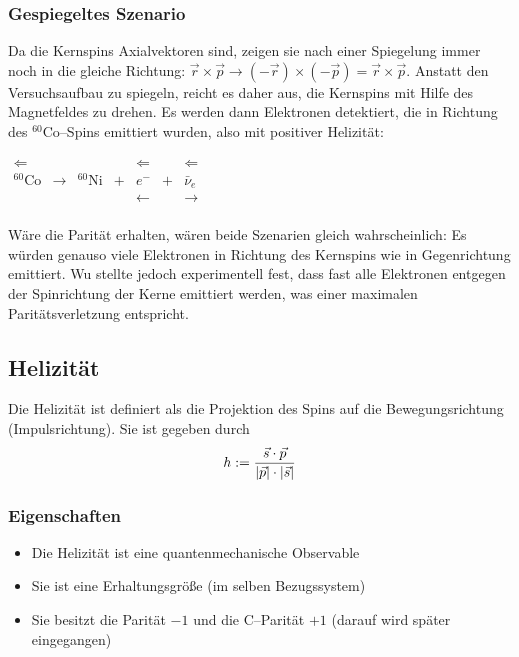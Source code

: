 \documentclass[Ex4_Zusammenfassung.tex]{subfiles}
\begin{document}
\subsubsection*{Gespiegeltes Szenario}
Da die Kernspins Axialvektoren sind, zeigen sie nach einer Spiegelung immer noch in die gleiche Richtung: $\vec r \times \vec p \rightarrow (-\vec r) \times (-\vec p) = \vec r \times \vec p $. Anstatt den Versuchsaufbau zu spiegeln, reicht es daher aus, die Kernspins mit Hilfe des Magnetfeldes zu drehen. Es werden dann Elektronen detektiert, die in Richtung des $^{60}\text{Co}$--Spins emittiert wurden, also 
mit positiver Helizität:
\begin{table}[h]
	\centering
	$
	\begin{array}{ccccccc}
		\Longleftarrow    &                 &                  &   & \Leftarrow     &   & \Leftarrow      \\
		{}^{60}\text{Co}        & \longrightarrow & {}^{60}\text{Ni} & + & e^-    & + & \bar{\nu}_e     \\
		&                 &                  &   & \longleftarrow &   & \longrightarrow \\
	\end{array}
	$
\end{table}

Wäre die Parität erhalten, wären beide Szenarien gleich wahrscheinlich: Es würden genauso viele Elektronen in Richtung des Kernspins wie in Gegenrichtung emittiert. Wu stellte jedoch experimentell fest, dass fast alle Elektronen entgegen der Spinrichtung der Kerne emittiert werden, was einer maximalen Paritätsverletzung entspricht.

\subsection{Helizität}
Die Helizität ist definiert als die Projektion des Spins auf die Bewegungsrichtung (Impulsrichtung). Sie ist gegeben durch
\begin{equation}
	h:=\frac{\vec{s}\cdot \vec{p}}{\left\vert \vec{p} \right\vert\cdot \left\vert \vec{s} \right\vert}
\end{equation}

\subsubsection{Eigenschaften}
\begin{itemize}
	\item Die Helizität ist eine quantenmechanische Observable
	\item Sie ist eine Erhaltungsgröße (im selben Bezugssystem)
	\item Sie besitzt die Parität $-1$ und die C--Parität $+1$ (darauf wird später eingegangen)
\end{itemize}
\end{document}
